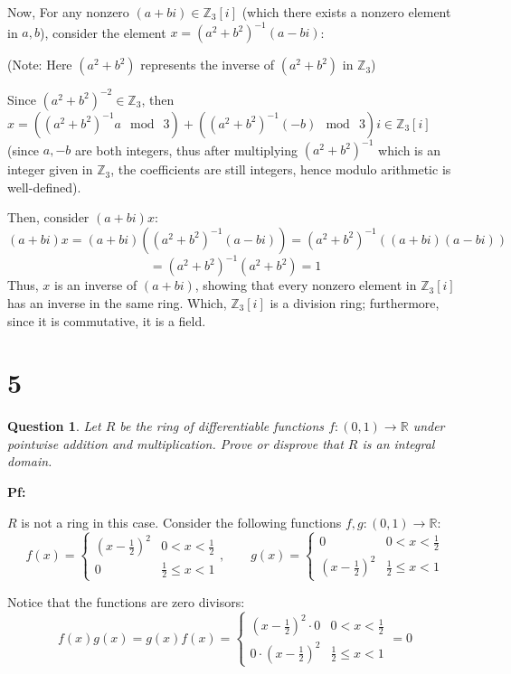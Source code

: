 \documentclass{article}
\newtheorem{question}{Question}
\begin{document}
\hfill

Now, For any nonzero $(a+bi)\in\mathbb{Z}_3[i]$ (which there exists a nonzero element in $a,b$), consider the element $x=(a^2+b^2)^{-1}(a-bi)$:

(Note: Here $(a^2+b^2)$ represents the inverse of $(a^2+b^2)$ in $\mathbb{Z}_3$)

Since $(a^2+b^2)^{-2}\in\mathbb{Z}_3$, then $x = ((a^2+b^2)^{-1}a\mod\ 3)+((a^2+b^2)^{-1}(-b)\mod\ 3)i \in \mathbb{Z}_3[i]$ (since $a,-b$ are both integers,
thus after multiplying $(a^2+b^2)^{-1}$ which is an integer given in $\mathbb{Z}_3$, the coefficients are still integers, hence modulo arithmetic is well-defined).

Then, consider $(a+bi)x$:
$$(a+bi)x = (a+bi)((a^2+b^2)^{-1}(a-bi)) = (a^2+b^2)^{-1}((a+bi)(a-bi))$$
$$=(a^2+b^2)^{-1}(a^2+b^2) = 1$$
Thus, $x$ is an inverse of $(a+bi)$, showing that every nonzero element in $\mathbb{Z}_3[i]$ has an inverse in the same ring.
Which, $\mathbb{Z}_3[i]$ is a division ring; furthermore, since it is commutative, it is a field.

\break

\section*{5}
\begin{myBox}[]{}
    \begin{question}
        Let $R$ be the ring of differentiable functions $f:(0,1)\rightarrow\mathbb{R}$ under pointwise addition
        and multiplication. Prove or disprove that $R$ is an integral domain. 
    \end{question}
\end{myBox}

\textbf{Pf:}

$R$ is not a ring in this case. Consider the following functions $f,g:(0,1)\rightarrow \mathbb{R}$:
$$f(x)=\begin{cases}
    (x-\frac{1}{2})^2 & 0<x<\frac{1}{2}\\
    0 & \frac{1}{2}\leq x < 1
\end{cases},\quad\quad g(x)=\begin{cases}
    0 & 0<x<\frac{1}{2}\\
    (x-\frac{1}{2})^2 & \frac{1}{2}\leq x <1
\end{cases}$$

Notice that the functions are zero divisors:
$$f(x)g(x) = g(x)f(x)=\begin{cases}
    (x-\frac{1}{2})^2\cdot 0 & 0<x<\frac{1}{2}\\
    0 \cdot (x-\frac{1}{2})^2 & \frac{1}{2}\leq x<1
\end{cases} = 0$$
\end{document}
